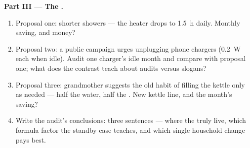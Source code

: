\begin{problem}
\medskip\noindent\textbf{Part III --- The .}
\begin{enumerate}[resume]
  \item Proposal one: shorter showers --- the heater drops
        to \qty{1.5}{h} daily. Monthly saving,  and
        money?
  \item Proposal two: a public campaign urges unplugging
        phone chargers (\qty{0.2}{W} each when idle).
        Audit one charger's idle month and compare with
        proposal one; what does the contrast teach about
        audits versus slogans?
  \item Proposal three: grandmother suggests the old habit
        of filling the kettle only as needed --- half the
        water, half the . New kettle line, and the
        month's saving?
  \item Write the audit's conclusions: three sentences ---
        where the  truly live, which formula
        factor the standby case teaches, and which single
        household change pays best.
\end{enumerate}
\end{problem}
